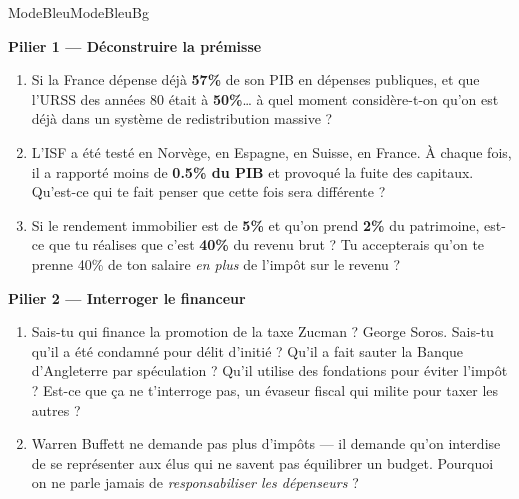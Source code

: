 \documentclass[a4paper,11pt]{article}
\newcommand{\stat}[1]{\textbf{\textcolor{ChapColor}{#1}}}
\begin{document}
\begin{fichemode}{ModeBleu}{ModeBleuBg}

\textbf{\textcolor{ModeBleuDark}{ Pilier 1 --- D\'econstruire la pr\'emisse}}

\begin{enumerate}[label=\textcolor{ModeBleu}{\textbf{Q\arabic*.}}, itemsep=5pt, leftmargin=*]
  \item \og{}Si la France d\'epense d\'ej\`a \stat{57\%} de son PIB en d\'epenses publiques, et que l'URSS des ann\'ees 80 \'etait \`a \stat{50\%}\ldots{} \`a quel moment consid\`ere-t-on qu'on est d\'ej\`a dans un syst\`eme de redistribution massive ?\fg{}

  \item \og{}L'ISF a \'et\'e test\'e en Norv\`ege, en Espagne, en Suisse, en France. \`A chaque fois, il a rapport\'e moins de \stat{0.5\% du PIB} et provoqu\'e la fuite des capitaux. Qu'est-ce qui te fait penser que cette fois sera diff\'erente ?\fg{}

  \item \og{}Si le rendement immobilier est de \stat{5\%} et qu'on prend \stat{2\%} du patrimoine, est-ce que tu r\'ealises que c'est \stat{40\%} du revenu brut ? Tu accepterais qu'on te prenne 40\% de ton salaire \emph{en plus} de l'imp\^ot sur le revenu ?\fg{}
\end{enumerate}

\vspace{3mm}
\textbf{\textcolor{ModeBleuDark}{ Pilier 2 --- Interroger le financeur}}

\begin{enumerate}[label=\textcolor{ModeBleu}{\textbf{Q\arabic*.}}, itemsep=5pt, leftmargin=*, start=4]
  \item \og{}Sais-tu qui finance la promotion de la taxe Zucman ? George Soros. Sais-tu qu'il a \'et\'e condamn\'e pour d\'elit d'initi\'e ? Qu'il a fait sauter la Banque d'Angleterre par sp\'eculation ? Qu'il utilise des fondations pour \'eviter l'imp\^ot ? Est-ce que \c{c}a ne t'interroge pas, un \'evaseur fiscal qui milite pour taxer les autres ?\fg{}

  \item \og{}Warren Buffett ne demande pas plus d'imp\^ots --- il demande qu'on interdise de se repr\'esenter aux \'elus qui ne savent pas \'equilibrer un budget. Pourquoi on ne parle jamais de \emph{responsabiliser les d\'epenseurs} ?\fg{}
\end{enumerate}


\end{fichemode}
\end{document}
